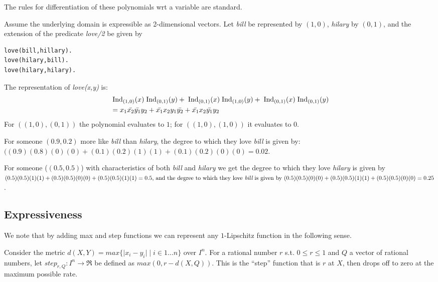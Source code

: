\documentclass{article} %
\begin{document}
The rules for differentiation of these polynomials wrt a variable are standard. 

\begin{example}
Assume the underlying domain is expressible as 2-dimensional vectors. Let {\em bill} be represented by \((1, 0)\), {\em hilary} by \((0,1)\), and the extension of the predicate {\em love/2} be given by
\begin{lstlisting}
love(bill,hillary).
love(hilary,bill).
love(hilary,hilary).
\end{lstlisting}
The representation of {\em love(x,y)} is:
\begin{align*}
&\;\mbox{Ind}_{(1,0)}(x)\;\mbox{Ind}_{(0,1)}(y) + \;\mbox{Ind}_{(0,1)}(x)\;\mbox{Ind}_{(1,0)}(y) + \;\mbox{Ind}_{(0,1)}(x)\;\mbox{Ind}_{(0,1)}(y)  \\
&= x_1\bar{x_2}\bar{y_1}y_2 + \bar{x_1}x_2y_1\bar{y_2} + \bar{x_1}x_2\bar{y_1}y_2
\end{align*}
For \(((1,0),(0,1))\) the polynomial evaluates to \(1\); for \(((1,0),(1,0))\) it evaluates to \(0\). 

For someone \((0.9,0.2)\) more like {\em bill} than {\em hilary}, the degree to which they love
{\em bill} is given by: 
\(((0.9)(0.8)(0)(0) + (0.1)(0.2)(1)(1) + (0.1)(0.2)(0)(0)=0.02\).

For someone (\((0.5,0.5)\)) with characteristics of both {\em bill} and {\em hilary} we get the degree to which they love {\em hilary}  is given by
\((0.5)(0.5)(1)(1)+(0.5)(0.5)(0)(0)+(0.5)(0.5)(1)(1)=0.5$, and the degree to which they love {\em bill} is given by $(0.5)(0.5)(0)(0) + (0.5)(0.5)(1)(1) + (0.5)(0.5)(0)(0)=0.25\).

\end{example}

\subsection{Expressiveness}
We note that by adding max and step functions we can represent any $1$-Lipschitz function in the following sense.

Consider the metric \(d(X,Y) = max \{\lvert x_i - y_i \rvert \mid i\in 1\ldots n \}\) over \(I^n\). For a 
rational number \(r\) s.t. \(0 \leq r \leq 1\) and \(Q\) a vector of rational numbers, let \(step_{r,Q}:I^n \rightarrow \Re\) be defined as \(max(0, r-d(X,Q))\). This is the ``step'' function that is \(r\) at \(X\), then drops off to zero at the maximum possible rate. 
\end{document}
